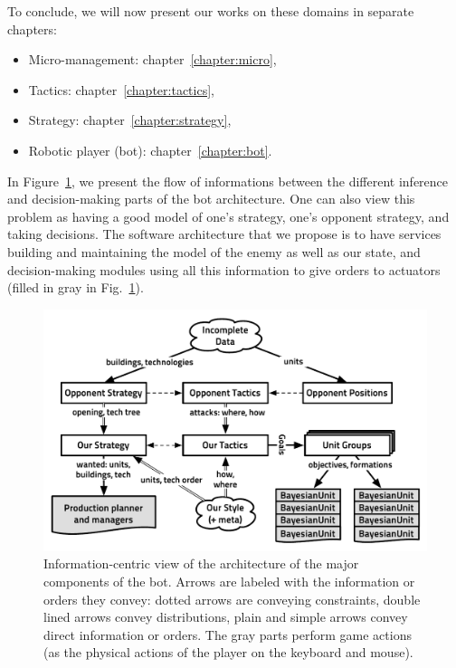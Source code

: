 To conclude, we will now present our works on these domains in separate chapters:
\begin{itemize}
    \item Micro-management: chapter~\ref{chapter:micro},
    \item Tactics: chapter~\ref{chapter:tactics},
    \item Strategy: chapter~\ref{chapter:strategy},
    \item Robotic player (bot): chapter~\ref{chapter:bot}.
\end{itemize}
In Figure~\ref{fig:conceptbbq}, we present the flow of informations between the different inference and decision-making parts of the bot architecture. One can also view this problem as having a good model of one's strategy, one's opponent strategy, and taking decisions. The software architecture that we propose is to have services building and maintaining the model of the enemy as well as our state, and decision-making modules using all this information to give orders to actuators (filled in gray in Fig.~\ref{fig:conceptbbq}).

\begin{figure}[!ht]
\begin{center}
\includegraphics[width=0.96\columnwidth]{images/starcraft_bbq_concept.pdf}
\end{center}
\caption{Information-centric view of the architecture of the major components of the bot. Arrows are labeled with the information or orders they convey: dotted arrows are conveying constraints, double lined arrows convey distributions, plain and simple arrows convey direct information or orders. The gray parts perform game actions (as the physical actions of the player on the keyboard and mouse).}
\label{fig:conceptbbq}
\end{figure}


